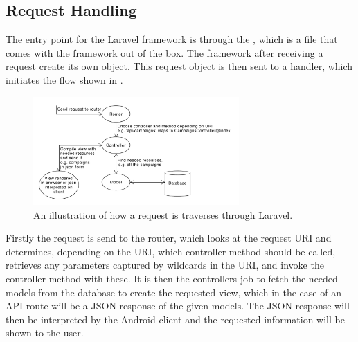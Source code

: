 \subsection{Request Handling}
\label{sub:request_handling}
The entry point for the Laravel framework is through the , which is a file that comes with the framework out of the box. The framework after receiving a request create its own  object. This request object is then sent to a handler, which initiates the flow shown in .

\begin{figure}[!htbp]
    \centering
    \includegraphics[width=0.7\textwidth]{graphic/architecture/laravel_flow.pdf}
    \caption{An illustration of how a request is traverses through Laravel.}
    \label{fig:laravel_flow}
\end{figure}
\FloatBarrier

Firstly the request is send to the router, which looks at the request URI and determines, depending on the URI, which controller-method should be called, retrieves any parameters captured by wildcards in the URI, and invoke the controller-method with these. It is then the controllers job to fetch the needed models from the database to create the requested view, which in the case of an API route will be a JSON response of the given models. The JSON response will then be interpreted by the Android client and the requested information will be shown to the user. 

